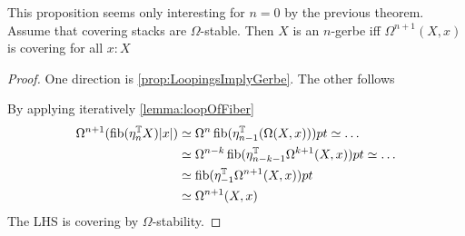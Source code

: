 \documentclass{article}
\begin{document}
\begin{prop}{\label{prop:GerbeIffLooping}}
	This proposition seems only interesting for $n = 0$ by the previous theorem. Assume that covering stacks are $\Omega$-stable. Then $X$ is an $n$-gerbe iff $\Omega^{n+1}(X,x)$ is covering for all $x: X$	
\end{prop}
\begin{proof}
	One direction is \ref{prop:LoopingsImplyGerbe}. The other follows
	
	By applying iteratively \ref{lemma:loopOfFiber} 
	\begin{align*}
		\Omega^{n+1} (\operatorname{fib} (\eta_n^{\mathbb{T}} X) |x|) &\simeq \Omega^n \operatorname{fib} (\eta_{n-1}^{\mathbb{T}} (\Omega (X,x))) pt \simeq \hdots \\
		&\simeq \Omega^{n-k} \operatorname{fib}(\eta_{n-k-1}^{\mathbb{T}} \Omega^{k+1}(X,x)) pt \simeq \hdots \\
		&\simeq \operatorname{fib} (\eta_{-1}^{\mathbb{T}} \Omega^{n+1} (X,x)) pt \\
		&\simeq \Omega^{n+1} (X , x)
	\end{align*}
	The LHS is covering by $\Omega$-stability.
\end{proof}





%
%	
%
\end{document}
